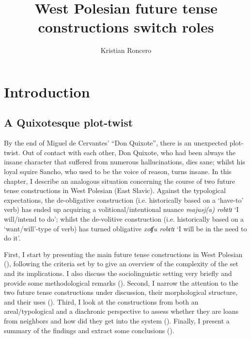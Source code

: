 \documentclass[output=paper,colorlinks,citecolor=brown]{langscibook}
\author{Kristian Roncero\orcid{}\affiliation{Ludwig-Maximilians-Universität München}}
\title{West Polesian future tense constructions switch roles}
\begin{document}
\maketitle

\section{Introduction} \label{sec:roncero:1}
\subsection{A Quixotesque plot-twist} \label{sec:roncero:1.1}

By the end of Miguel de Cervantes’ “Don Quixote”, there is an unexpected plot-twist. Out of contact with each other, Don Quixote, who had been always the insane character that suffered from numerous hallucinations, dies sane; whilst his loyal squire Sancho, who used to be the voice of reason, turns insane. In this chapter, I describe an analogous situation concerning the course of two future tense constructions in West Polesian (East Slavic). Against the typological expectations, the de-obligative construction (i.e. historically based on a ‘have-to’ verb) has ended up acquiring a volitional/intentional nuance \textit{majusj(a) robɪtɪ} ‘I will/intend to do’; whilst the de-volitive construction (i.e. historically based on a ‘want/will’-type of verb) has turned obligative \textit{xoʧu robɪtɪ} ‘I will be in the need to do it’.

First, I start by presenting the main future tense constructions in West Polesian (), following the criteria set by \citet{Dahl2000b} to give an overview of the complexity of the set and its implications. I also discuss the sociolinguistic setting very briefly and provide some methodological remarks (). Second, I narrow the attention to the two future tense constructions under discussion, their morphological structure, and their uses (). Third, I look at the constructions from both an areal/typological and a diachronic perspective to assess whether they are loans from neighbors and how did they get into the system (). Finally, I present a summary of the findings and extract some conclusions ().
\end{document}

